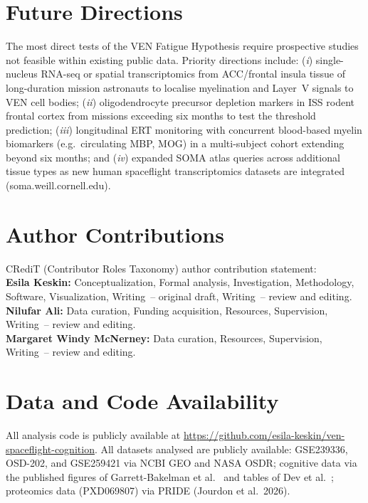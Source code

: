 \documentclass[11pt]{article}
\begin{document}
\section*{Future Directions}

The most direct tests of the VEN Fatigue Hypothesis require prospective
studies not feasible within existing public data.
Priority directions include: (\textit{i}) single-nucleus RNA-seq or spatial
transcriptomics from ACC/frontal insula tissue of long-duration mission
astronauts to localise myelination and Layer~V signals to VEN cell bodies;
(\textit{ii}) oligodendrocyte precursor depletion markers in ISS rodent
frontal cortex from missions exceeding six months to test the threshold
prediction; (\textit{iii}) longitudinal ERT monitoring with concurrent
blood-based myelin biomarkers (e.g.\ circulating MBP, MOG) in a
multi-subject cohort extending beyond six months; and (\textit{iv})
expanded SOMA atlas queries across additional tissue types as new human
spaceflight transcriptomics datasets are integrated (soma.weill.cornell.edu).

\section*{Author Contributions}

CRediT (Contributor Roles Taxonomy) author contribution statement:\\[2pt]
\textbf{Esila Keskin:}
Conceptualization, Formal analysis, Investigation, Methodology,
Software, Visualization, Writing~-- original draft, Writing~-- review
and editing.\\[2pt]
\textbf{Nilufar Ali:}
Data curation, Funding acquisition, Resources, Supervision,
Writing~-- review and editing.\\[2pt]
\textbf{Margaret Windy McNerney:}
Data curation, Resources, Supervision, Writing~-- review and editing.

\section*{Data and Code Availability}

All analysis code is publicly available at
\url{https://github.com/esila-keskin/ven-spaceflight-cognition}.
All datasets analysed are publicly available:
GSE239336, OSD-202, and GSE259421 via NCBI GEO and NASA OSDR;
cognitive data via the published figures of Garrett-Bakelman et
al.~\cite{garrett2019} and tables of Dev et al.~\cite{dev2024};
proteomics data (PXD069807) via PRIDE (Jourdon et al.\ 2026).
\end{document}
